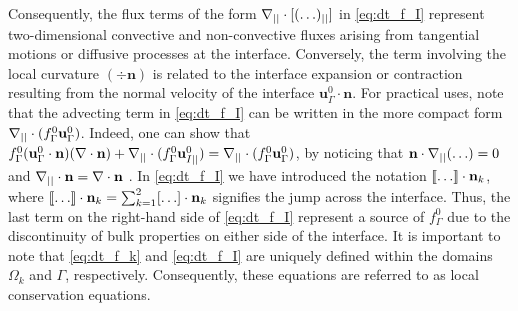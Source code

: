Consequently, the flux terms of the form $\mathbf{\nabla}_{||}\cdot[(\ldots)_{||}]$ in \ref{eq:dt_f_I} represent two-dimensional  convective and non-convective fluxes arising from tangential motions or diffusive processes at the interface.
Conversely, the term involving the local curvature $(\div \textbf{n})$ is related to the interface expansion or contraction resulting from the normal velocity of the interface $\textbf{u}_\Gamma^0\cdot \textbf{n}$. For practical uses, note that the advecting term in \ref{eq:dt_f_I} can be written in the more compact form $\mathbf{\nabla}_{||}\cdot(f_\Gamma^0 \textbf{u}_\Gamma^0)$. 
Indeed, one can show that $f_\Gamma^0 (\textbf{u}_\Gamma^0 \cdot \textbf{n})(\mathbf{\nabla}\cdot \textbf{n})
+\mathbf{\nabla}_{||}\cdot(f_\Gamma^0 \textbf{u}_{I||}^0) = \mathbf{\nabla}_{||}\cdot(f_\Gamma^0 \textbf{u}_\Gamma^0)$, by noticing that $\textbf{n}\cdot\mathbf{\nabla}_{||}(\ldots) = 0$ and $\mathbf{\nabla}_{||}\cdot\textbf{n} = \mathbf{\nabla}\cdot\textbf{n}$ \citep{nadim1996concise}.
In \ref{eq:dt_f_I} we have introduced the notation $\llbracket \ldots \rrbracket \cdot \textbf{n}_k$, where $\llbracket \ldots \rrbracket \cdot \textbf{n}_k = \sum_{k=1}^2 [\ldots] \cdot \textbf{n}_k$ signifies the jump across the interface. Thus, the last term on the right-hand side of \ref{eq:dt_f_I} represent a source of $f_\Gamma^0$ due to the discontinuity of bulk properties on either side of the interface. 
It is important to note that \ref{eq:dt_f_k} and \ref{eq:dt_f_I} are uniquely defined within the domains $\Omega_k$ and $\Gamma$, respectively.
Consequently, these equations are referred to as local conservation equations.



 


